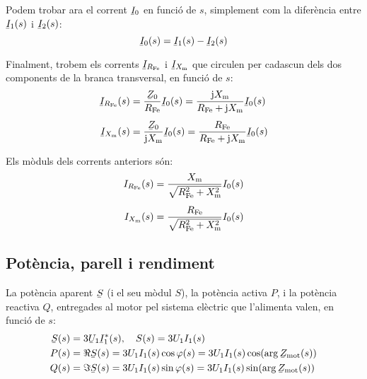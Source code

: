 Podem trobar ara el corrent $\cmplx{I}_0$ en funció de $s$, simplement com la diferència entre  $\cmplx{I}_1(s)$ i  $\cmplx{I}_2(s)$:
\begin{equation}
    \cmplx{I}_0(s) = \cmplx{I}_1(s) - \cmplx{I}_2(s)
\end{equation}

Finalment,  trobem els corrents $\cmplx{I}_{R\ped{Fe}}$ i $\cmplx{I}_{X\ped{m}}$ que circulen per cadascun dels dos components de la branca transversal, en funció de $s$:
\begin{subequations}
\begin{align}
    \cmplx{I}_{R\ped{Fe}}(s) &= \frac{\cmplx{Z}_0}{R\ped{Fe}} \cmplx{I}_0(s) = \frac{\ju X\ped{m}}{ R\ped{Fe} + \ju X\ped{m}}  \cmplx{I}_0(s) \\[1ex]
    \cmplx{I}_{X\ped{m}}(s) &= \frac{\cmplx{Z}_0}{\ju X\ped{m}} \cmplx{I}_0(s) = \frac{
    R\ped{Fe}}{ R\ped{Fe} + \ju X\ped{m}}  \cmplx{I}_0(s)
\end{align}
\end{subequations}

Els mòduls dels corrents anteriors són:
\begin{subequations}
\begin{align}
    I_{R_\mathrm{Fe}}(s) &=  \frac{X_\mathrm{m}}{\sqrt{R_\mathrm{Fe}^2 + X_\mathrm{m}^2}}  I_0(s) \\[1ex]
    I_{X_\mathrm{m}}(s) &=   \frac{R_\mathrm{Fe}}{\sqrt{R_\mathrm{Fe}^2 + X_\mathrm{m}^2}}  I_0(s)
\end{align}
\end{subequations}

\subsection{Potència, parell i rendiment}\label{sec:mot-p-t}

La potència aparent $\cmplx{S}$ (i el seu mòdul $S$), la potència activa  $P$, i la potència reactiva $Q$, entregades al motor pel sistema elèctric que l'alimenta valen, en funció de $s$:
\begin{subequations}\index{motors d'inducció!potència activa}\index{motors d'inducció!potència reactiva}\index{motors d'inducció!potència aparent}
\begin{align}
	\cmplx{S}(s)  &=  3 \cmplx{U}_1 \cmplx{I}_1^*(s), \quad S(s)  =  3 U_1 I_1(s)\label{eq:mot-S}\\
    P(s)  &=  \Re \cmplx{S}(s) = 3 U_1 I_1(s) \cos\varphi(s) = 3 U_1 I_1(s) \cos(\arg\cmplx{Z}\ped{mot}(s))\label{eq:mot-P}\\
    Q(s)  &=  \Im \cmplx{S}(s) = 3 U_1 I_1(s) \sin\varphi(s) = 3 U_1 I_1(s) \sin (\arg\cmplx{Z}\ped{mot}(s))\label{eq:mot-Q}
\end{align}
\end{subequations}

